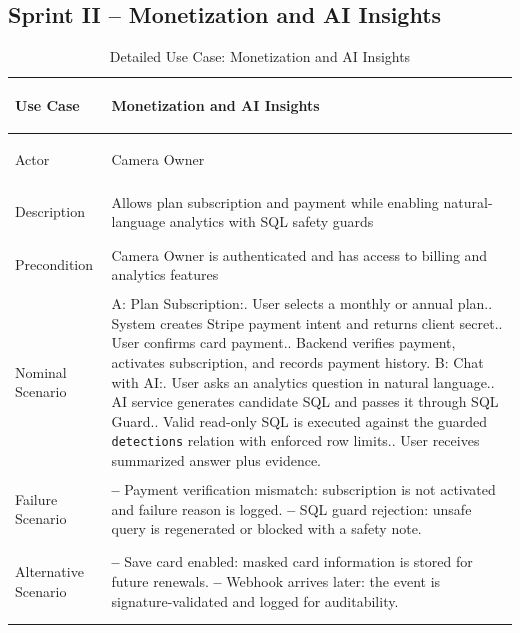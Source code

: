 \documentclass[12pt,a4paper,oneside]{report}
\newlength{\TblTwoKeyW}
\newlength{\TblTwoValW}
\begin{document}
\subsection*{Sprint II -- Monetization and AI Insights}
{\small
\begin{longtable}{|>{\bfseries\raggedright\arraybackslash}p{\TblTwoKeyW}|>{\raggedright\arraybackslash}p{\TblTwoValW}|}
\hline
Use Case    & Monetization and AI Insights \\ \hline
Actor       & Camera Owner \\ \hline
Description & Allows plan subscription and payment while enabling natural-language analytics with SQL safety guards \\ \hline
Precondition & Camera Owner is authenticated and has access to billing and analytics features \\ \hline
Nominal Scenario &
A: Plan Subscription:\newline
1. User selects a monthly or annual plan.\newline
2. System creates Stripe payment intent and returns client secret.\newline
3. User confirms card payment.\newline
4. Backend verifies payment, activates subscription, and records payment history.\newline
B: Chat with AI:\newline
1. User asks an analytics question in natural language.\newline
2. AI service generates candidate SQL and passes it through SQL Guard.\newline
3. Valid read-only SQL is executed against the guarded \texttt{detections} relation with enforced row limits.\newline
4. User receives summarized answer plus evidence. \\ \hline
Failure Scenario &
\textbf{--} Payment verification mismatch: subscription is not activated and failure reason is logged.\newline
\textbf{--} SQL guard rejection: unsafe query is regenerated or blocked with a safety note. \\ \hline
Alternative Scenario &
\textbf{--} Save card enabled: masked card information is stored for future renewals.\newline
\textbf{--} Webhook arrives later: the event is signature-validated and logged for auditability. \\ \hline
\caption{Detailed Use Case: Monetization and AI Insights}
\label{tab:app_uc_s2_monetization}
\end{longtable}
}
\end{document}
